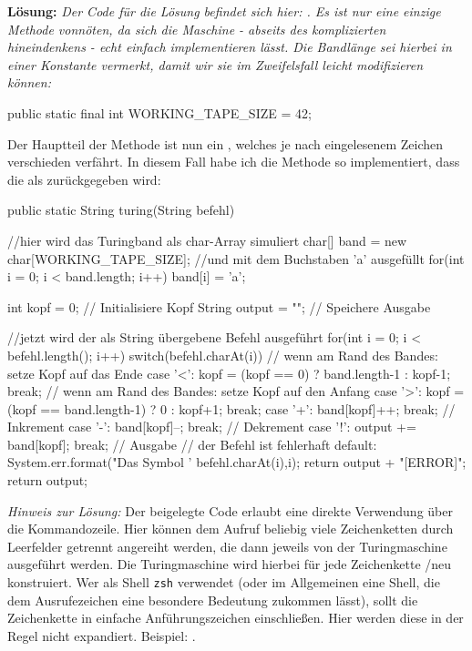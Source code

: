\documentclass[table]{sopra-base}
\makeatletter
\let\T\texttt
\def\pc{\noexpand\rotatebox[origin=c]{270}{\noexpand\faPaperclip{}}}
\def\aTask#1#2{\attachDocumentText{#1/#2}{\pc{} \noexpand\detokenize{#2}}}
\newenvironment{solution}{\null\par\noindent\textbf{\textcolor{sob@col@uulm@cs}{Lösung:}}\newline\bgroup\color{black}\slshape\ignorespaces}{\egroup}
\makeatother
\begin{document}
\begin{solution}
    Der Code für die Lösung befindet sich hier: \aTask{middle}{A31_Turing.java}. Es ist nur eine einzige Methode vonnöten, da sich die Maschine - abseits des komplizierten hineindenkens - echt einfach implementieren lässt. Die Bandlänge sei hierbei in einer Konstante vermerkt, damit wir sie im Zweifelsfall leicht modifizieren können:
\begin{java*}[morekeywords={[4]{WORKING_TAPE_SIZE}}]
public static final int WORKING_TAPE_SIZE = 42;
\end{java*}
     Der Hauptteil der Methode  ist nun ein , welches je nach eingelesenem Zeichen verschieden verfährt. In diesem Fall habe ich die Methode so implementiert, dass die  als  zurückgegeben wird:
\begin{java}[firstnumber=35,morekeywords={[4]{WORKING_TAPE_SIZE}}]
public static String turing(String befehl) {
    //hier wird das Turingband als char-Array simuliert
    char[] band = new char[WORKING_TAPE_SIZE];
    //und mit dem Buchstaben 'a' ausgefüllt
    for(int i = 0; i < band.length; i++)
        band[i] = 'a';

    int kopf = 0; // Initialisiere Kopf
    String output = ""; // Speichere Ausgabe

    //jetzt wird der als String übergebene Befehl ausgeführt
    for(int i = 0; i < befehl.length(); i++){
        switch(befehl.charAt(i)){
            // wenn am Rand des Bandes: setze Kopf auf das Ende
            case '<': kopf = (kopf == 0) ? band.length-1 : kopf-1; break;
            // wenn am Rand des Bandes: setze Kopf auf den Anfang
            case '>': kopf = (kopf == band.length-1) ? 0 : kopf+1; break;
            case '+': band[kopf]++; break; // Inkrement
            case '-': band[kopf]--; break; // Dekrement
            case '!': output += band[kopf]; break; // Ausgabe
            // der Befehl ist fehlerhaft
            default:
                System.err.format("Das Symbol '%
                    befehl.charAt(i),i);
                return output + "[ERROR]";
        }
    }
    return output;
}
\end{java}
\textit{Hinweis zur Lösung:} Der beigelegte Code erlaubt eine direkte Verwendung über die Kommandozeile. Hier können dem Aufruf  beliebig viele Zeichenketten durch Leerfelder getrennt angereiht werden, die dann jeweils von der Turingmaschine ausgeführt werden. Die Turingmaschine wird hierbei für jede Zeichenkette /neu konstruiert. Wer als Shell \T{zsh} verwendet (oder im Allgemeinen eine Shell, die dem Ausrufezeichen eine besondere Bedeutung zukommen lässt), sollt die Zeichenkette in einfache Anführungszeichen einschließen. Hier werden diese in der Regel nicht expandiert. Beispiel: .
\end{solution}
\end{document}
